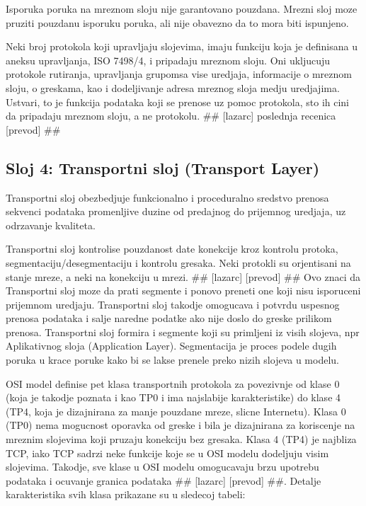 \documentclass[a4paper,12pt, master]{etf}
\begin{document}
	Isporuka poruka na mreznom sloju nije garantovano pouzdana. Mrezni sloj moze pruziti 
	pouzdanu isporuku poruka, ali nije obavezno da to mora biti ispunjeno.

	Neki broj protokola koji upravljaju slojevima, imaju funkciju koja je definisana u aneksu
	upravljanja, ISO 7498/4, i pripadaju mreznom sloju. Oni ukljucuju protokole rutiranja,
	upravljanja grupomsa vise uredjaja, informacije o mreznom sloju, o greskama, kao i 
	dodeljivanje adresa mreznog sloja medju uredjajima. Ustvari, to je funkcija podataka koji 
	se prenose uz pomoc protokola, sto ih cini da pripadaju mreznom sloju, a ne protokolu. 
	\#\# [lazarc] poslednja	recenica [prevod] \#\#

	\subsection{Sloj 4: Transportni sloj (Transport Layer)}

	Transportni sloj obezbedjuje funkcionalno i proceduralno sredstvo prenosa sekvenci podataka
	promenljive duzine od predajnog do prijemnog uredjaja, uz odrzavanje kvaliteta.

	Transportni sloj kontrolise pouzdanost date konekcije kroz kontrolu protoka,
	segmentaciju/desegmentaciju i kontrolu gresaka. Neki protokli su orjentisani na stanje 
	mreze, a neki na konekciju u mrezi. \#\# [lazarc] [prevod] \#\# Ovo znaci da Transportni 
	sloj moze da prati segmente i ponovo preneti one koji nisu isporuceni prijemnom uredjaju. 
	Transportni sloj takodje omogucava i potvrdu uspesnog prenosa podataka i salje naredne 
	podatke ako nije doslo do greske prilikom prenosa. Transportni sloj formira i segmente 
	koji su primljeni iz visih slojeva, npr Aplikativnog sloja (Application Layer). 
	Segmentacija je proces podele dugih poruka u krace poruke kako bi se lakse prenele preko 
	nizih slojeva u modelu.

	OSI model definise pet klasa transportnih protokola za povezivnje od klase 0 (koja je 
	takodje poznata i kao TP0 i ima najslabije karakteristike) do klase 4 (TP4, koja je 
	dizajnirana za manje pouzdane mreze, slicne Internetu). Klasa 0 (TP0) nema mogucnost 
	oporavka od greske i bila je dizajnirana za koriscenje na mreznim slojevima koji pruzaju 
	konekciju bez gresaka. Klasa 4 (TP4) je najbliza TCP, iako TCP sadrzi neke funkcije koje 
	se u OSI modelu dodeljuju visim slojevima. Takodje, sve klase u OSI modelu omogucavaju 
	brzu upotrebu podataka i ocuvanje granica podataka \#\# [lazarc] [prevod] \#\#. Detalje 
	karakteristika svih klasa prikazane su u sledecoj tabeli:
\end{document}
